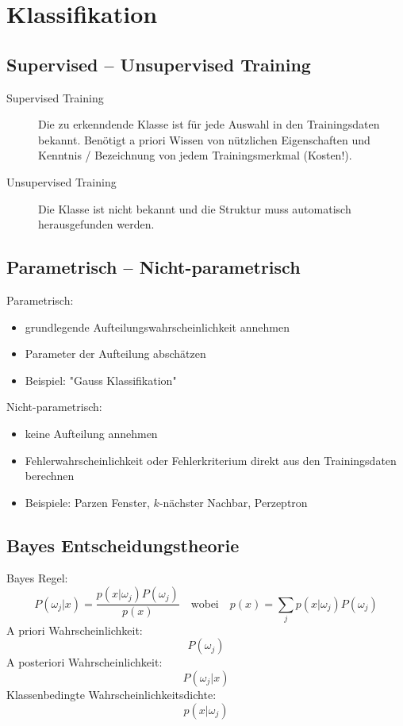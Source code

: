 
\chapter{Klassifikation}

\section{Supervised -- Unsupervised Training}

\begin{description}
\item[Supervised Training] Die zu erkenndende Klasse ist für jede Auswahl in den Trainingsdaten bekannt. Benötigt a priori Wissen von nützlichen Eigenschaften und Kenntnis / Bezeichnung von jedem Trainingsmerkmal (Kosten!).
\item[Unsupervised Training] Die Klasse ist nicht bekannt und die Struktur muss automatisch herausgefunden werden.
\end{description}

\section{Parametrisch -- Nicht-parametrisch}

Parametrisch:
\begin{itemize}
\item grundlegende Aufteilungswahrscheinlichkeit annehmen
\item Parameter der Aufteilung abschätzen
\item Beispiel: "{}Gauss Klassifikation"{}
\end{itemize}
Nicht-parametrisch:
\begin{itemize}
\item keine Aufteilung annehmen
\item Fehlerwahrscheinlichkeit oder Fehlerkriterium direkt aus den Trainingsdaten berechnen
\item Beispiele: Parzen Fenster, $k$-nächster Nachbar, Perzeptron
\end{itemize}


\section{Bayes Entscheidungstheorie}

Bayes Regel: $$P(\omega_j | x) = \frac{p(x | \omega_j) P(\omega_j)}{p(x)} \quad \textrm{wobei} \quad p(x) = \sum\limits_{j} p(x | \omega_j) P(\omega_j)$$
A priori Wahrscheinlichkeit: $$P(\omega_j)$$
A posteriori Wahrscheinlichkeit: $$P(\omega_j | x)$$
Klassenbedingte Wahrscheinlichkeitsdichte: $$p(x | \omega_j)$$

